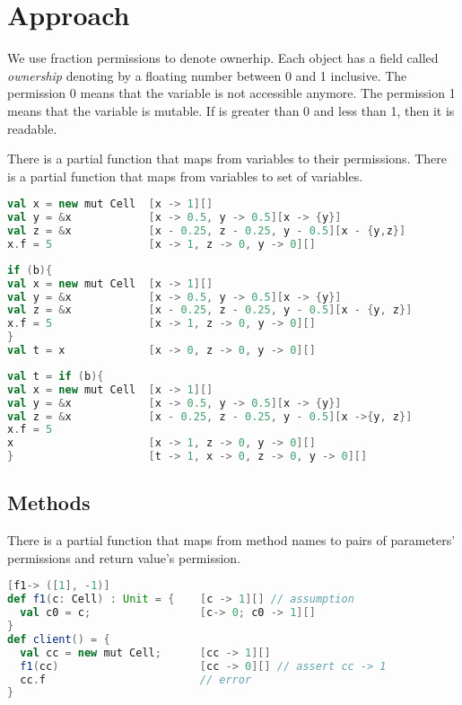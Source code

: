 \section{Approach}
We use fraction permissions to denote ownerhip. Each object has a field called \emph{ownership} denoting by a floating number between 0 and 1 inclusive. The permission 0 means that the variable is not accessible anymore. The permission 1 means that the variable is mutable. If  is greater than 0 and less than 1, then it is readable.

There is a partial function  that maps from variables to their permissions.
There is a partial function  that maps from variables to set of variables. 

\begin{lstlisting}[language=Scala,basicstyle=\footnotesize\ttfamily]
val x = new mut Cell  [x -> 1][]
val y = &x            [x -> 0.5, y -> 0.5][x -> {y}] 
val z = &x            [x - 0.25, z - 0.25, y - 0.5][x - {y,z}]
x.f = 5               [x -> 1, z -> 0, y -> 0][]  

\end{lstlisting} 

\begin{lstlisting}[language=Scala,basicstyle=\footnotesize\ttfamily]
if (b){
val x = new mut Cell  [x -> 1][]
val y = &x            [x -> 0.5, y -> 0.5][x -> {y}] 
val z = &x            [x - 0.25, z - 0.25, y - 0.5][x - {y, z}]
x.f = 5               [x -> 1, z -> 0, y -> 0][]  
}
val t = x             [x -> 0, z -> 0, y -> 0][]  
\end{lstlisting} 

\begin{lstlisting}[language=Scala,basicstyle=\footnotesize\ttfamily]
val t = if (b){
val x = new mut Cell  [x -> 1][]
val y = &x            [x -> 0.5, y -> 0.5][x -> {y}] 
val z = &x            [x - 0.25, z - 0.25, y - 0.5][x ->{y, z}]
x.f = 5 
x                     [x -> 1, z -> 0, y -> 0][]  
}                     [t -> 1, x -> 0, z -> 0, y -> 0][]  
\end{lstlisting} 

\subsection{Methods}
There is a partial function  that maps from method names to pairs of parameters' permissions and return value's permission.
\begin{lstlisting}[language=Scala,basicstyle=\footnotesize\ttfamily]
[f1-> ([1], -1)] 
def f1(c: Cell) : Unit = {    [c -> 1][] // assumption
  val c0 = c;                 [c-> 0; c0 -> 1][]
}    
def client() = {
  val cc = new mut Cell;      [cc -> 1][] 
  f1(cc)                      [cc -> 0][] // assert cc -> 1
  cc.f                        // error
}
\end{lstlisting}

